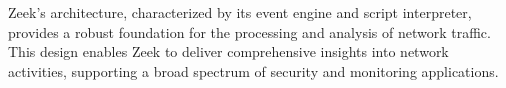 Zeek's architecture, characterized by its event engine and script interpreter, provides a robust foundation for the processing and analysis of network traffic. This design enables Zeek to deliver comprehensive insights into network activities, supporting a broad spectrum of security and monitoring applications.
